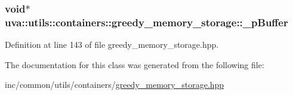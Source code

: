 \subsubsection[{\+\_\+p\+Buffer}]{\setlength{\rightskip}{0pt plus 5cm}void$\ast$ uva\+::utils\+::containers\+::greedy\+\_\+memory\+\_\+storage\+::\+\_\+p\+Buffer\hspace{0.3cm}{\ttfamily [protected]}}\label{classuva_1_1utils_1_1containers_1_1greedy__memory__storage_ade35ae22f918c450a3868f4e96c628ca}


Definition at line 143 of file greedy\+\_\+memory\+\_\+storage.\+hpp.



The documentation for this class was generated from the following file\+:\begin{DoxyCompactItemize}
\item 
inc/common/utils/containers/\hyperlink{greedy__memory__storage_8hpp}{greedy\+\_\+memory\+\_\+storage.\+hpp}\end{DoxyCompactItemize}
